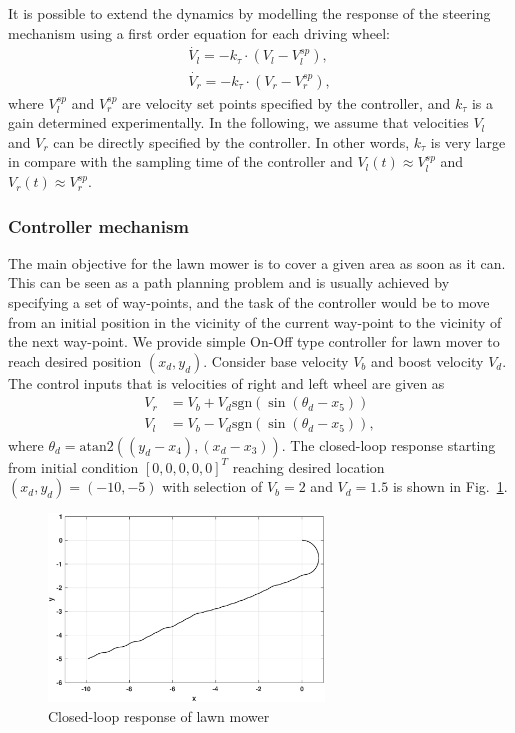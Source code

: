 It is possible to extend the dynamics by modelling the response of the steering mechanism using a first order equation for each driving wheel:
\begin{align*}
\dot{V_l} = -k_\tau\cdot (V_l - V_l^{sp}),\\
\dot{V_r} = -k_\tau\cdot (V_r - V_r^{sp}),
\end{align*}
where $V_l^{sp}$ and $V_r^{sp}$ are velocity set points specified by the controller, and $k_\tau$ is a gain determined experimentally.
In the following, we assume that velocities $V_l$ and $V_r$ can be directly specified by the controller. In other words, $k_\tau$ is very large in compare with the sampling time of the controller and $V_l(t)\approx V_l^{sp}$ and $V_r(t) \approx V_r^{sp}$.

\subsubsection{Controller mechanism}
The main objective for the lawn mower is to cover a given area as soon as it can. This can be seen as a path planning problem and is usually achieved by specifying a set of way-points, and the task of the controller would be to move from an initial position in the vicinity of the current way-point to the vicinity of the next way-point.
We provide simple On-Off type controller for lawn mover to reach desired position $(x_d,y_d)$. Consider base velocity $V_b$ and boost velocity $V_d$.  
 The control inputs that is velocities of right and left wheel are given as
\begin{align}
V_r&=V_b+V_d \text{sgn}(\sin(\theta_d-x_5))\nonumber\\
V_l&=V_b-V_d \text{sgn}(\sin(\theta_d-x_5)),\label{eq:controller}
\end{align}
where $\theta_d=\text{atan2}((y_d-x_4),(x_d-x_3))$.
The closed-loop response starting from initial condition $[0,0,0,0,0]^T$ reaching desired location $(x_d,y_d)=(-10,-5)$ with selection of $V_b=2$ and $V_d=1.5$ is shown in Fig.~\ref{fig3}.
\begin{figure}[hpt]
\centering
\includegraphics[scale=0.8,height=5cm]{figures/resp1}
\caption{Closed-loop response of lawn mower}
\label{fig3}
\end{figure}

